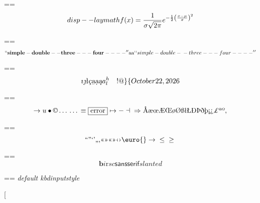 \documentclass{book}
\makeatletter
\newcommand\Texinfocommandstyletextkbd[1]{{\ttfamily\textsl{#1}}}%
\newenvironment{Texinfopreformatted}{%
  \par\GNUTobeylines\obeyspaces\frenchspacing\parskip=\z@\parindent=\z@}{}
{\catcode`\^^M=13 \gdef\GNUTobeylines{\catcode`\^^M=13 \def^^M{\null\par}}}
\newenvironment{Texinfoindented}{\begin{list}{}{}\item\relax}{\end{list}}
\renewcommand{\_}{\Texinfounderscore\discretionary{}{}{}}
\makeatother
\begin{document}
\begin{Texinfoindented}
\begin{Texinfopreformatted}
\end{Texinfopreformatted}
\[
disp--laymath
f(x) = {1 \over \sigma \sqrt{2\pi}}e^{-{1 \over 2}\left({x-\mu \over \sigma}\right)^2}
\]
\begin{Texinfopreformatted}%
\ttfamily 
\end{Texinfopreformatted}
\[
\mathbf{``simple-double--three---four----''} \hbox{aa}
`\hbox{}`simple-double-\hbox{}-three---four----'\hbox{}'
\]
\begin{Texinfopreformatted}%
\ttfamily 
\end{Texinfopreformatted}
\[
\imath{} \jmath{}
\mathord{\text{\l{}}} \textsl{\c{c}}
\textsl{\b{a}} \textsl{\d{a}} \textsl{\k{a}} a^{h}_{l}
 \ {}\ {} \ {}\-{}  ! @ \} \{ 
\today{}
\]
\begin{Texinfopreformatted}%
\ttfamily 
\end{Texinfopreformatted}
\[
\rightarrow{}
u
\bullet{} \copyright{} \dots{} \dots{} \equiv{}
\fbox{error} \mapsto{} - \dashv{} \Rightarrow{}
\mathord{\text{\AA{}}} \mathord{\text{\ae{}}} \mathord{\text{\oe{}}} \mathord{\text{\AE{}}} \mathord{\text{\OE{}}} \mathord{\text{\o{}}} \mathord{\text{\O{}}} \mathord{\text{\ss{}}} \mathord{\text{\l{}}} \mathord{\text{\L{}}} \mathord{\text{\DH{}}}
\mathord{\text{\TH{}}} \mathord{\text{\dh{}}} \mathord{\text{\th{}}} \mathord{\text{\textexclamdown{}}} \mathord{\text{\textquestiondown{}}} \mathsterling{}
\mathord{\text{\textordfeminine{}}} \mathord{\text{\textordmasculine{}}} , 
\]
\begin{Texinfopreformatted}%
\ttfamily 
\end{Texinfopreformatted}
\[
\mathord{\text{\textquotedblleft{}}} \mathord{\text{\textquotedblright{}}} 
\mathord{\text{\textquoteleft{}}} \mathord{\text{\textquoteright{}}} \mathord{\text{\quotedblbase{}}} \mathord{\text{\quotesinglbase{}}} \mathord{\text{\guillemotleft{}}}
\mathord{\text{\guillemotright{}}} \mathord{\text{\guillemotleft{}}} \mathord{\text{\guillemotright{}}} \mathord{\text{\guilsinglleft{}}}
\mathord{\text{\guilsinglright{}}} \euro{} \rightarrow{} \leq{} \geq{}
\]
\begin{Texinfopreformatted}%
\ttfamily 
\end{Texinfopreformatted}
\[
\mathbf{b} \mathit{i} \mathrm{r} sc \mathsf{sansserif} \mathit{slanted}
\]
\begin{Texinfopreformatted}%
\ttfamily 
\Texinfocommandstyletextkbd{default kbdinputstyle}
\end{Texinfopreformatted}
\begin{description}
\item[{\parbox[b]{\linewidth}{%
}}
\end{description}
\end{Texinfoindented}
\end{document}
